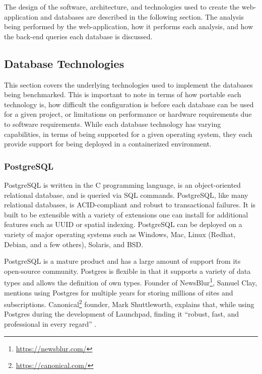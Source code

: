 The design of the software, architecture, and technologies used to create the web-application and databases are described in the following section. The analysis being performed by the web-application, how it performs each analysis, and how the back-end queries each database is discussed.

\subsection{Database Technologies}

This section covers the underlying technologies used to implement the databases being benchmarked. This is important to note in terms of how portable each technology is, how difficult the configuration is before each database can be used for a given project, or limitations on performance or hardware requirements due to software requirements. While each database technology has varying capabilities, in terms of being supported for a given operating system, they each provide support for being deployed in a containerized environment.


\subsubsection{PostgreSQL}
PostgreSQL is written in the C programming language, is an object-oriented relational database, and is queried via SQL commands. PostgreSQL, like many relational databases, is ACID-compliant and robust to transactional failures. It is built to be extensible with a variety of extensions one can install for additional features such as UUID or spatial indexing. PostgreSQL can be deployed on a variety of major operating systems such as Windows, Mac, Linux (Redhat, Debian, and a few others), Solaris, and BSD.

PostgreSQL is a mature product and has a large amount of support from its open-source community. Postgres is flexible in that it supports a variety of data types and allows the definition of own types. Founder of NewsBlur\footnote{\url{https://newsblur.com/}}, Samuel Clay, mentions using Postgres for multiple years for storing millions of sites and subscriptions. Canonical\footnote{\url{https://canonical.com/}} founder, Mark Shuttleworth, explains that, while using Postgres during the development of Launchpad, finding it ``robust, fast, and professional in every regard'' \cite{postgresAbout}.

